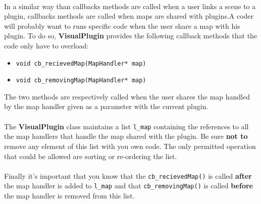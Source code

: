 \documentclass[a4paper]{scrreprt}
\begin{document}
	\paragraph{}
	In a similar way than callbacks methods are called when a user links a scene to
	a plugin, callbacks methods are called when maps are shared with plugins.A
	coder will probably want to runs specific code when the user share a map with
	his plugin. To do so, \textbf{VisualPlugin} provides the following callback
	methods that the code only have to overload:
	\begin{itemize}
	  \item \texttt{void cb\_recievedMap(MapHandler* map)}
	  \item \texttt{void cb\_removingMap(MapHandler* map)}
	\end{itemize}
	The two methods are respectively called when the user shares the map handled by
	the map handler given as a parameter with the current plugin.
	\paragraph{}
	The \textbf{VisualPlugin} class maintains a list \texttt{l\_map} containing the
	references to all the map handlers that handle the map shared with the plugin.
	Be sure \textbf{not to} remove any element of this list with you own code. The
	only permitted operation that could be allowed are sorting or re-ordering the
	list.
	\paragraph{}
	Finally it's important that you know that the \texttt{cb\_recievedMap()} is
	called \textbf{after} the map handler is added to \texttt{l\_map} and that
	\texttt{cb\_removingMap()} is called \textbf{before} the map handler is removed
	from this list.
\end{document}
